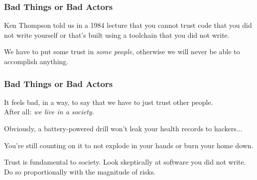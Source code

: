\begin{frame}
\frametitle{Bad Things or Bad Actors}

Ken Thompson told us in a 1984 lecture that you cannot trust code that you did not write yourself or that's built using a toolchain that you did not write.

We have to put some trust in \textit{some people}, otherwise we will never be able to accomplish anything. 

\end{frame}


\begin{frame}
\frametitle{Bad Things or Bad Actors}

It feels bad, in a way, to say that we have to just trust other people.\\
\quad After all: \textit{we live in a society.}

Obviously, a battery-powered drill won't leak your health records to hackers...

You're still counting on it to not explode in your hands or burn your home down.

Trust is fundamental to society. Look skeptically at software you did not write.\\
\quad Do so proportionally with the magnitude of risks.

\end{frame}





